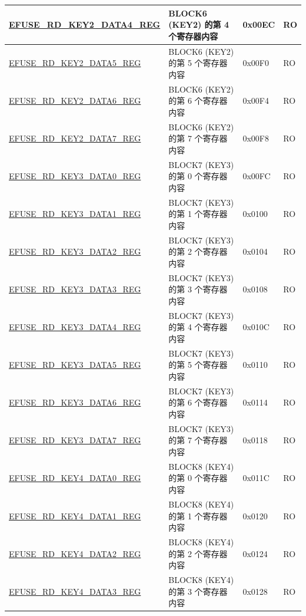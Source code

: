 \begin{longtable}{ | p{6.8cm} | p{7cm} | p{1.3cm} | p{1.2cm} | }
    \hyperref[regdesc:EFUSERDKEY2DATANREG]{EFUSE\_RD\_KEY2\_DATA4\_REG} & BLOCK6 (KEY2) 的第 4 个寄存器内容 & 0x00EC & RO \\ \hline
    \hyperref[regdesc:EFUSERDKEY2DATANREG]{EFUSE\_RD\_KEY2\_DATA5\_REG} & BLOCK6 (KEY2) 的第 5 个寄存器内容 & 0x00F0 & RO \\ \hline
    \hyperref[regdesc:EFUSERDKEY2DATANREG]{EFUSE\_RD\_KEY2\_DATA6\_REG} & BLOCK6 (KEY2) 的第 6 个寄存器内容 & 0x00F4 & RO \\ \hline
    \hyperref[regdesc:EFUSERDKEY2DATANREG]{EFUSE\_RD\_KEY2\_DATA7\_REG} & BLOCK6 (KEY2) 的第 7 个寄存器内容 & 0x00F8 & RO \\ \hline
    \hyperref[regdesc:EFUSERDKEY3DATANREG]{EFUSE\_RD\_KEY3\_DATA0\_REG} & BLOCK7 (KEY3) 的第 0 个寄存器内容 & 0x00FC & RO \\ \hline
    \hyperref[regdesc:EFUSERDKEY3DATANREG]{EFUSE\_RD\_KEY3\_DATA1\_REG} & BLOCK7 (KEY3) 的第 1 个寄存器内容 & 0x0100 & RO \\ \hline
    \hyperref[regdesc:EFUSERDKEY3DATANREG]{EFUSE\_RD\_KEY3\_DATA2\_REG} & BLOCK7 (KEY3) 的第 2 个寄存器内容 & 0x0104 & RO \\ \hline
    \hyperref[regdesc:EFUSERDKEY3DATANREG]{EFUSE\_RD\_KEY3\_DATA3\_REG} & BLOCK7 (KEY3) 的第 3 个寄存器内容 & 0x0108 & RO \\ \hline
    \hyperref[regdesc:EFUSERDKEY3DATANREG]{EFUSE\_RD\_KEY3\_DATA4\_REG} & BLOCK7 (KEY3) 的第 4 个寄存器内容 & 0x010C & RO \\ \hline
    \hyperref[regdesc:EFUSERDKEY3DATANREG]{EFUSE\_RD\_KEY3\_DATA5\_REG} & BLOCK7 (KEY3) 的第 5 个寄存器内容 & 0x0110 & RO \\ \hline
    \hyperref[regdesc:EFUSERDKEY3DATANREG]{EFUSE\_RD\_KEY3\_DATA6\_REG} & BLOCK7 (KEY3) 的第 6 个寄存器内容 & 0x0114 & RO \\ \hline
    \hyperref[regdesc:EFUSERDKEY3DATANREG]{EFUSE\_RD\_KEY3\_DATA7\_REG} & BLOCK7 (KEY3) 的第 7 个寄存器内容 & 0x0118 & RO \\ \hline
    \hyperref[regdesc:EFUSERDKEY4DATANREG]{EFUSE\_RD\_KEY4\_DATA0\_REG} & BLOCK8 (KEY4) 的第 0 个寄存器内容 & 0x011C & RO \\ \hline
    \hyperref[regdesc:EFUSERDKEY4DATANREG]{EFUSE\_RD\_KEY4\_DATA1\_REG} & BLOCK8 (KEY4) 的第 1 个寄存器内容 & 0x0120 & RO \\ \hline
    \hyperref[regdesc:EFUSERDKEY4DATANREG]{EFUSE\_RD\_KEY4\_DATA2\_REG} & BLOCK8 (KEY4) 的第 2 个寄存器内容 & 0x0124 & RO \\ \hline
    \hyperref[regdesc:EFUSERDKEY4DATANREG]{EFUSE\_RD\_KEY4\_DATA3\_REG} & BLOCK8 (KEY4) 的第 3 个寄存器内容 & 0x0128 & RO \\ \hline

\end{longtable}
